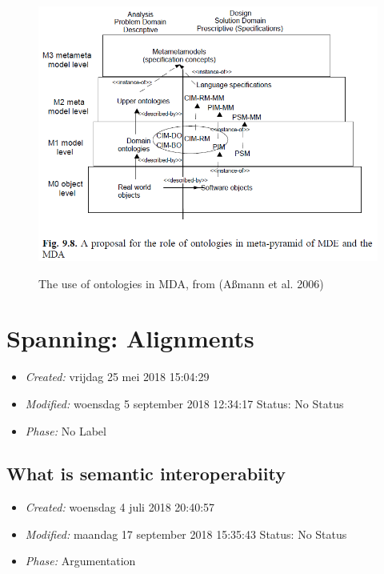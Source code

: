 \documentclass[a4paper,11pt,oneside,oldfontcommands]{memoir}
\theoremstyle{definition}
\theoremstyle{break}		%
\numberwithin{equation}{chapter}
\numberwithin{figure}{chapter}
\begin{document}
\begin{figure}
\hypertarget{fig:OntosInMDE}{%
\centering
\includegraphics[width=5.91667in,height=3.60417in]{src/images/OntosInMDE.png}
\caption{The use of ontologies in MDA, from (Aßmann et al.
2006)}\label{fig:OntosInMDE}
}
\end{figure}

\hypertarget{spanning-alignments}{%
\chapter{Spanning: Alignments}\label{spanning-alignments}}

\begin{itemize}
\tightlist
\item
  \emph{Created:} vrijdag 25 mei 2018 15:04:29
\item
  \emph{Modified:} woensdag 5 september 2018 12:34:17 Status: No Status
\item
  \emph{Phase:} No Label
\end{itemize}

\hypertarget{what-is-semantic-interoperabiity}{%
\section{What is semantic
interoperabiity}\label{what-is-semantic-interoperabiity}}

\begin{itemize}
\tightlist
\item
  \emph{Created:} woensdag 4 juli 2018 20:40:57
\item
  \emph{Modified:} maandag 17 september 2018 15:35:43 Status: No Status
\item
  \emph{Phase:} Argumentation
\end{itemize}
\end{document}
